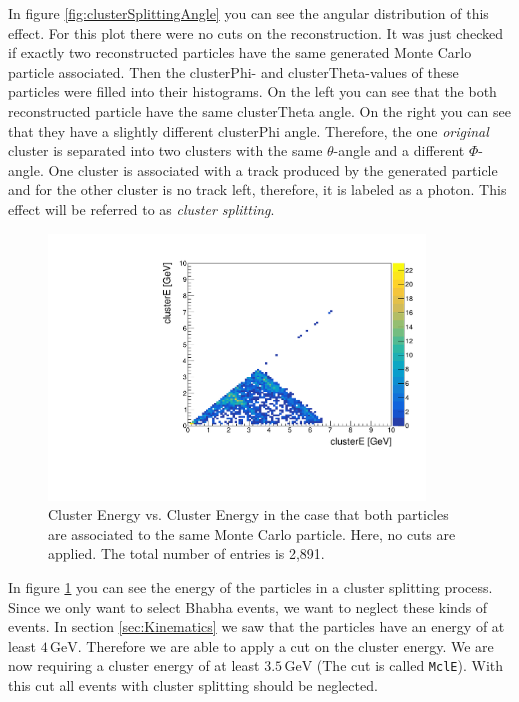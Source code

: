 \documentclass[a4paper,11pt,twosided,final,german,openbib,pdftex,listof=totoc,bibliography=totoc]{scrbook}
\begin{document}
In figure \ref{fig:clusterSplittingAngle} you can see the angular distribution of this effect. For this plot there were no cuts on the reconstruction. It was just checked if exactly two reconstructed particles have the same generated Monte Carlo particle associated. Then the clusterPhi- and clusterTheta-values of these particles were filled into their histograms. On the left you can see that the both reconstructed particle have the same clusterTheta angle. On the right you can see that they have a slightly different clusterPhi angle. Therefore, the one \textit{original} cluster  is separated into two clusters with the same $\theta$-angle and a different $\Phi$-angle. One cluster is associated with a track produced by the generated particle and for the other cluster is no track left, therefore, it is labeled as a photon. This effect will be referred to as \textit{cluster splitting}.





\begin{figure}[h!]
	\centering
	\includegraphics[width=10cm]{AnhangPlots/EEdoubleMCE}
	\caption[Cluster Splitting Energy Distribution]{Cluster Energy vs. Cluster Energy in the case that both particles are associated to the same Monte Carlo particle. Here, no cuts are applied. The total number of entries is 2,891.}
	\label{fig:clusterSplittingE}
\end{figure}

In figure \ref{fig:clusterSplittingE} you can see the energy of the particles in a cluster splitting process. Since we only want to select Bhabha events, we want to neglect these kinds of events. In section \ref{sec:Kinematics} we saw that the particles have an energy of at least $4\,\textrm{GeV}$. Therefore we are able to apply a cut on the cluster energy. We are now requiring a cluster energy of at least $3.5\,\textrm{GeV}$ (The cut is called \texttt{MclE}). With this cut all events with cluster splitting should be neglected.
\end{document}
